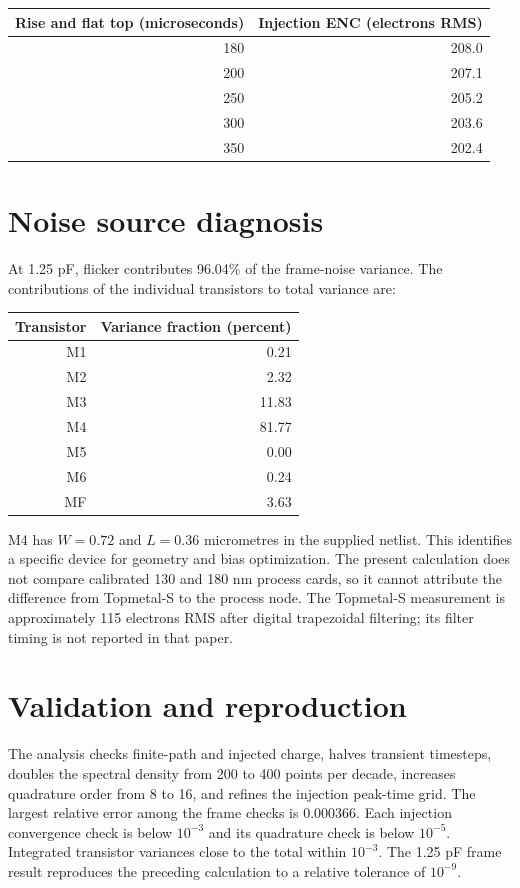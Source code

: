 \documentclass[11pt,a4paper]{article}
\begin{document}
\begin{center}\begin{tabular}{rr}\toprule
Rise and flat top (microseconds) & Injection ENC (electrons RMS)\\\midrule
180 & 208.0 \\
200 & 207.1 \\
250 & 205.2 \\
300 & 203.6 \\
350 & 202.4 \\
\bottomrule\end{tabular}\end{center}

\section*{Noise source diagnosis}
At 1.25 pF, flicker contributes 96.04\% of the frame-noise variance.
The contributions of the individual transistors to total variance are:
\begin{center}\begin{tabular}{rr}\toprule
Transistor & Variance fraction (percent)\\\midrule
M1 & 0.21 \\
M2 & 2.32 \\
M3 & 11.83 \\
M4 & 81.77 \\
M5 & 0.00 \\
M6 & 0.24 \\
MF & 3.63 \\
\bottomrule\end{tabular}\end{center}
M4 has $W=0.72$ and $L=0.36$ micrometres in the supplied netlist.
This identifies a specific device for geometry and bias optimization.
The present calculation does not compare calibrated 130 and 180 nm process
cards, so it cannot attribute the difference from Topmetal-S to the process node.
The Topmetal-S measurement is approximately 115 electrons RMS after digital
trapezoidal filtering; its filter timing is not reported in that paper.

\section*{Validation and reproduction}
The analysis checks finite-path and injected charge, halves transient timesteps,
doubles the spectral density from 200 to 400 points per decade, increases
quadrature order from 8 to 16, and refines the injection peak-time grid.
The largest relative error among the frame checks is 0.000366.
Each injection convergence check is below $10^{-3}$ and its quadrature
check is below $10^{-5}$. Integrated transistor variances close to the total
within $10^{-3}$. The 1.25 pF frame result reproduces the preceding calculation
to a relative tolerance of $10^{-9}$.
\end{document}
